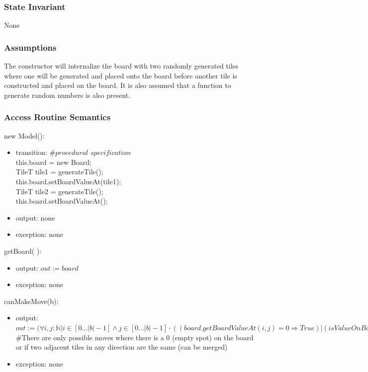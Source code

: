 \documentclass[12pt]{article}
\begin{document}
\subsubsection* {State Invariant}

None

\subsubsection* {Assumptions}

The constructor will internalize the board with two randomly generated tiles where one will be generated and placed onto the board before another tile is constructed and placed on the board. It is also assumed that a function to generate random numbers is also present.

\subsubsection* {Access Routine Semantics}

\noindent new Model():
\begin{itemize}
\item transition: \#$procedural$ $specification$\\
this.board = new Board;\\
TileT tile1 = generateTile();\\
this.board.setBoardValueAt(tile1);\\
TileT tile2 = generateTile();\\
this.board.setBoardValueAt();
\item output: none
\item exception: none
\end{itemize}

\noindent getBoard( ):
\begin{itemize}
\item output: $out := \mathit{board}$
\item exception: none
\end{itemize}

\noindent canMakeMove(b):
\begin{itemize}
\item output: $out := (\forall i,j : \mathbb{N} \vert i \in [0...|b| - 1] \land j \in [0...|b| - 1] \cdot ((board.getBoardValueAt(i, j) = 0 \Rightarrow True) \vert (isValueOnBoard(i - 1, j) \land board.getBoardValueAt(i, j) = board.getBoardValueAt(i - 1, j) \Rightarrow True) \vert (isValueOnBoard(i + 1, j) \land board.getBoardValueAt(i, j) = board.getBoardValueAt(i + 1, j) \Rightarrow True) \vert (isValueOnBoard(i, j - 1) \land board.getBoardValueAt(i, j) = board.getBoardValueAt(i, j - 1) \Rightarrow True) \vert (isValueOnBoard(i, j + 1) \land board.getBoardValueAt(i, j) = board.getBoardValueAt(i, j + 1) \Rightarrow True) \vert (True \Rightarrow False))$\\   \#There are only possible moves where there is a 0 (empty spot) on the board or if two adjacent tiles in any direction are the same (can be merged)
\item exception: none
\end{itemize}
\end{document}
